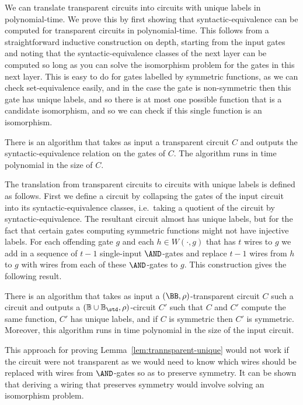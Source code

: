 \documentclass[a4paper,UKenglish]{lipics-v2018}
\begin{document}
We can translate transparent circuits into circuits with unique labels in
polynomial-time. We prove this by first showing that syntactic-equivalence can
be computed for transparent circuits in polynomial-time. This follows from a
straightforward inductive construction on depth, starting from the input gates
and noting that the syntactic-equivalence classes of the next layer can be
computed so long as you can solve the isomorphism problem for the gates in this
next layer. This is easy to do for gates labelled by symmetric functions, as we
can check set-equivalence easily, and in the case the gate is non-symmetric then
this gate has unique labels, and so there is at most one possible function that
is a candidate isomorphism, and so we can check if this single function is an
isomorphism.

\begin{lemma}
  There is an algorithm that takes as input a transparent circuit $C$ and
  outputs the syntactic-equivalence relation on the gates of $C$. The algorithm
  runs in time polynomial in the size of $C$.
  \label{lem:transparent-syntactic-equiv}
\end{lemma}

The translation from transparent circuits to circuits with unique labels is
defined as follows. First we define a circuit by collapsing the gates of the
input circuit into its syntactic-equivalence classes, i.e.\ taking a quotient of
the circuit by syntactic-equivalence. The resultant circuit almost has unique
labels, but for the fact that certain gates computing symmetric functions might
not have injective labels. For each offending gate $g$ and each $h \in W(\cdot,
g)$ that has $t$ wires to $g$ we add in a sequence of $t-1$ single-input
$\AND$-gates and replace $t-1$ wires from $h$ to $g$ with wires from each of
these $\AND$-gates to $g$. This construction gives the following result.

\begin{lemma}
  There is an algorithm that takes as input a $(\BB, \rho)$-transparent circuit
  $C$ such a circuit and outputs a $(\mathbb{B} \cup \mathbb{B}_{\std},
  \rho)$-circuit $C'$ such that $C$ and $C'$ compute the same function, $C'$ has
  unique labels, and if $C$ is symmetric then $C'$ is symmetric. Moreover, this
  algorithm runs in time polynomial in the size of the input circuit.
  \label{lem:transparent-unique}
\end{lemma}

This approach for proving Lemma~\ref{lem:trannsparent-unique} would not work if
the circuit were not transparent as we would need to know which wires should be
replaced with wires from $\AND$-gates so as to preserve symmetry. It can be
shown that deriving a wiring that preserves symmetry would involve solving an
isomorphism problem.
\end{document}

